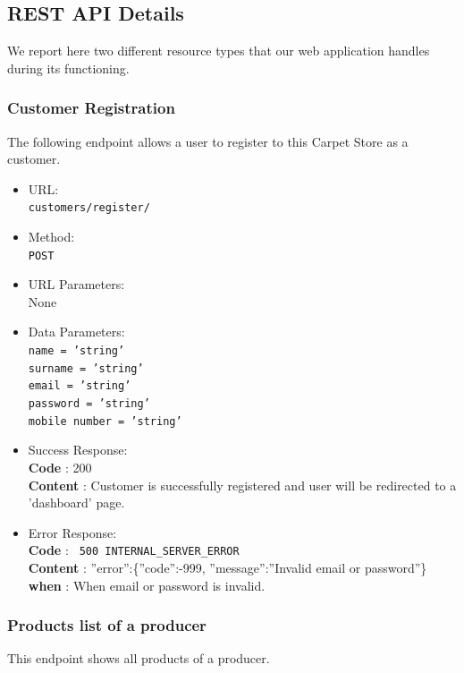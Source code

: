 \subsection{REST API Details}

We report here two different resource types that our web application handles during its functioning.

\subsubsection*{Customer Registration}

The following endpoint allows a user to register to this Carpet Store as a customer.


\begin{itemize}
    \item URL: \\\texttt{customers/register/}
    \item Method: \\\texttt{POST}
    \item URL Parameters: \\None
    \item Data Parameters: \\\texttt{name = 'string'\\surname = 'string'\\email = 'string'\\password = 'string'\\mobile number = 'string'}
    \item Success Response: \\\textbf{Code} : 200\\\textbf{Content} : Customer is successfully registered and user will be redirected to a 'dashboard' page.
    \item Error Response: \\\textbf{Code} : \texttt{ 500 INTERNAL\_SERVER\_ERROR}\\\textbf{Content} : ”error”:\{”code”:-999, ”message”:”Invalid email or password”\}\\\textbf{when} : When email or password is invalid.

\end{itemize}


\subsubsection*{Products list of a producer}

This endpoint shows all products of a producer.




